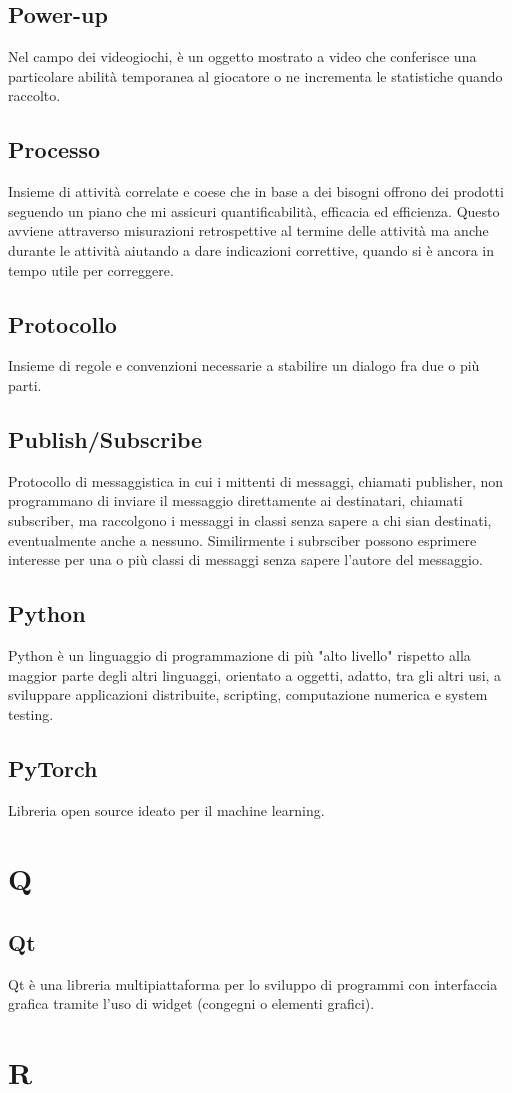\subsection{Power-up} Nel campo dei videogiochi, è un oggetto mostrato a video che conferisce una particolare abilità temporanea al giocatore o ne incrementa le statistiche quando raccolto.
\subsection{Processo} Insieme di attività correlate e coese che in base a dei bisogni offrono dei prodotti seguendo un piano che mi assicuri quantificabilità, efficacia ed efficienza. Questo avviene attraverso misurazioni retrospettive al termine delle attività ma anche durante le attività aiutando a dare indicazioni correttive, quando si è ancora in tempo utile per correggere.
\subsection{Protocollo} Insieme di regole e convenzioni necessarie a stabilire un dialogo fra due o più parti.
\subsection{Publish/Subscribe} Protocollo di messaggistica in cui i mittenti di messaggi, chiamati publisher, non programmano di inviare il messaggio direttamente ai destinatari, chiamati subscriber, ma raccolgono i messaggi in classi senza sapere a chi sian destinati, eventualmente anche a nessuno. Similirmente i subrsciber possono esprimere interesse per una o più classi di messaggi senza sapere l'autore del messaggio.
\subsection{Python} Python è un linguaggio di programmazione di più "alto livello" rispetto alla maggior parte degli altri linguaggi, orientato a oggetti, adatto, tra gli altri usi, a sviluppare applicazioni distribuite, scripting, computazione numerica e system testing.
\subsection{PyTorch} Libreria open source ideato per il machine learning.
\newpage \section{Q}
\subsection{Qt} Qt è una libreria multipiattaforma per lo sviluppo di programmi con interfaccia grafica tramite l'uso di widget (congegni o elementi grafici).
\newpage \section{R}
